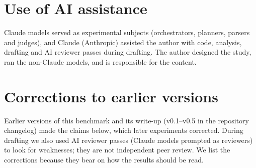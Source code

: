\documentclass[
  11pt]{article}
\begin{document}
\hypertarget{use-of-ai-assistance}{%
\section*{Use of AI assistance}\label{use-of-ai-assistance}}

Claude models served as experimental subjects (orchestrators, planners,
parsers and judges), and Claude (Anthropic) assisted the author with
code, analysis, drafting and AI reviewer passes during drafting. The
author designed the study, ran the non-Claude models, and is responsible
for the content.

\appendix

\hypertarget{sec:history}{%
\section{Corrections to earlier versions}\label{sec:history}}

Earlier versions of this benchmark and its write-up (v0.1--v0.5 in the
repository changelog) made the claims below, which later experiments
corrected. During drafting we also used AI reviewer passes (Claude
models prompted as reviewers) to look for weaknesses; they are not
independent peer review. We list the corrections because they bear on
how the results should be read.
\end{document}
